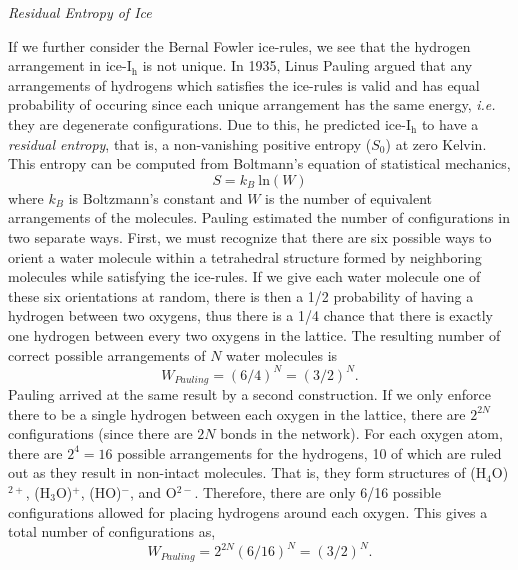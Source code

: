 
\begin{flushleft}
\textit{Residual Entropy of Ice}
\end{flushleft}

If we further consider the Bernal Fowler ice-rules, we see that the
hydrogen arrangement in ice-I$_\mathrm{h}$ is not unique. In 1935,
Linus Pauling argued that any arrangements of hydrogens which
satisfies the ice-rules is valid and has equal probability of
occuring since each unique arrangement has the same energy,
\textit{i.e.} they are degenerate configurations. Due to this, he
predicted ice-I$_\mathrm{h}$ to have a \textit{residual entropy}, that is, a
non-vanishing positive entropy ($S_{0}$) at zero Kelvin. This entropy
can be computed from Boltmann's equation of statistical mechanics,
\begin{equation}\label{eq:Boltzmann-W}
S = k_{B}~\mathrm{ln}(W)
\end{equation}
where $k_{B}$ is Boltzmann's constant and $W$ is the number of
equivalent arrangements of the molecules. Pauling estimated the number
of configurations in two separate ways.\cite{Pauling1935} First, we
must recognize that there are six possible ways to orient a water
molecule within a tetrahedral structure formed by neighboring
molecules while satisfying the ice-rules. If we give each water
molecule one of these six orientations at random, there is then a 1/2
probability of having a hydrogen between two oxygens, thus there is a
1/4 chance that there is exactly one hydrogen between every two
oxygens in the lattice. The resulting number of correct possible
arrangements of $N$ water molecules is
\begin{equation} \label{eq:Pauling-1}
W_{Pauling} = (6/4)^{N} = (3/2)^{N}.
\end{equation}   
Pauling arrived at the same result by a second construction. If we
 only enforce there to be a single hydrogen
between each oxygen in the lattice, there are $2^{2N}$ configurations
(since there are $2N$ bonds in the network). For each oxygen atom,
there are $2^{4} = 16$ possible arrangements for the hydrogens, 10 of
which are ruled out as they result in non-intact
molecules. That is, they form structures of (H$_{4}$O)$^{2+}$,
(H$_{3}$O)$^{+}$, (HO)$^{-}$, and O$^{2-}$. Therefore, there are only
6/16 possible configurations allowed for placing hydrogens around each
oxygen. This gives a total number of configurations as,
\begin{equation}
W_{Pauling} = 2^{2N}(6/16)^{N} = (3/2)^{N}.
\end{equation}

